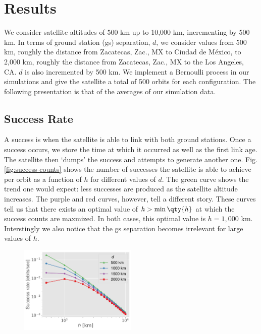 \vspace*{-1.5cm}
\chapter{Results}

We consider satellite altitudes of 500 km up to 10,000 km, incrementing by 500 km. In terms of ground station (gs) separation, \(d\), we consider values from 500 km, roughly the distance from Zacatecas, Zac., MX to Ciudad de M\'{e}xico, to 2,000 km, roughly the distance from Zacatecas, Zac., MX to the Los Angeles, CA. \(d\) is also incremented by 500 km. We implement a Bernoulli process in our simulations and give the satellite a total of 500 orbits for each configuration. The following presentation is that of the averages of our simulation data.

\section{Success Rate}

A success is when the satellite is able to link with both ground stations. Once a success occurs, we store the time at which it occurred as well as the first link age. The satellite then `dumps' the success and attempts to generate another one. Fig. \ref{fig:success-counts} shows the number of successes the satellite is able to achieve per orbit as a function of \(h\) for different values of \(d\). The \textcolor{mygreen}{green} curve shows the trend one would expect: less successes are produced as the satellite altitude increases. The \textcolor{mypurple}{purple} and \textcolor{myred}{red} curves, however, tell a different story. These curves tell us that there exists an optimal value of \(h > \min\qty{h}\) at which the success counts are maxmized. In both cases, this optimal value is \(h = 1,000\) km. Interstingly we also notice that the gs separation becomes irrelevant for large values of \(h\).

\begin{figure}
    \centering
    \vspace{-.1\baselineskip}
    \includegraphics[width=0.5\textwidth]{figures/success-rate.pdf}
    \caption{}
    \label{fig:success-rate}
\end{figure}

